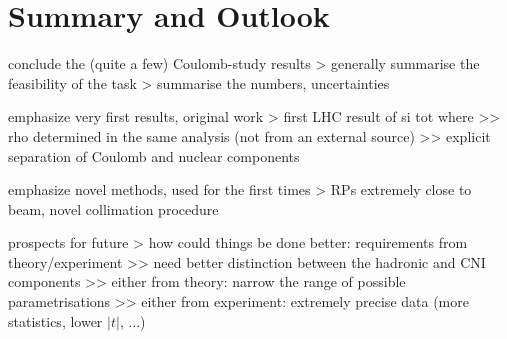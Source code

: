 \section{Summary and Outlook}

\> conclude the (quite a few) Coulomb-study results
\>> generally summarise the feasibility of the task
\>> summarise the numbers, uncertainties

\> emphasize very first results, original work
\>> first LHC result of si tot where
\>>> rho determined in the same analysis (not from an external source)
\>>> explicit separation of Coulomb and nuclear components

\> emphasize novel methods, used for the first times
\>> RPs extremely close to beam, novel collimation procedure

\> prospects for future
\>> how could things be done better: requirements from theory/experiment
\>>> need better distinction between the hadronic and CNI components
\>>> either from theory: narrow the range of possible parametrisations
\>>> either from experiment: extremely precise data (more statistics, lower $|t|$, ...)
